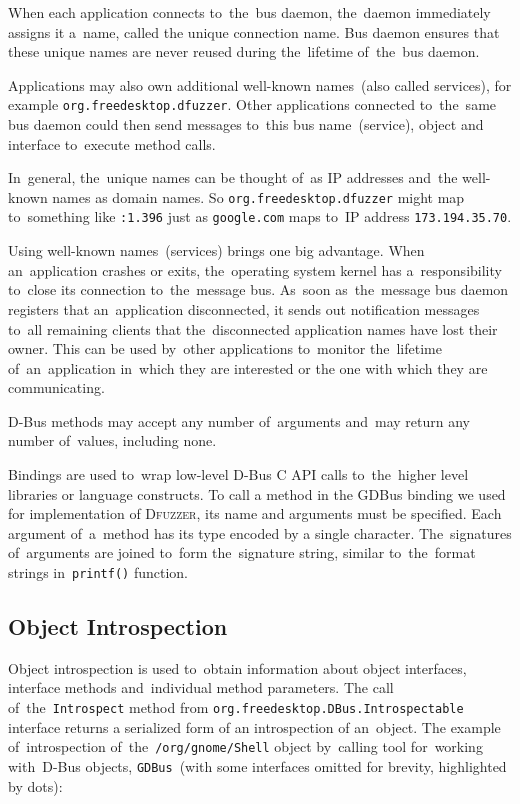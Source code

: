 \documentclass[conference]{IEEEtran}
\begin{document}
When each application connects to~the~bus daemon, the~daemon immediately
assigns it a~name, called the unique connection name. Bus daemon ensures that
these unique names are never reused during the~lifetime of~the~bus daemon.


Applications may also own additional well-known names~(also called services),
for example \texttt{org.freedesktop.dfuzzer}. Other applications connected
to~the~same bus daemon could then send messages to~this bus name~(service),
object and interface to~execute method calls.


In~general, the~unique names can be thought of~as IP addresses and~the well-known
names as domain names. So \texttt{org.freedesktop.dfuzzer} might map to~something
like \texttt{:1.396} just as \texttt{google.com} maps to~IP address
\texttt{173.194.35.70}.


Using well-known names~(services) brings one big advantage. When an~application
crashes or exits, the~operating system kernel has a~responsibility to~close
its connection to~the~message bus. As~soon as~the~message bus daemon registers
that an~application disconnected, it sends out notification messages to~all
remaining clients that the~disconnected application names have lost their owner.
This can be used by~other applications to~monitor the~lifetime of~an~application
in~which they are interested or the one with which they are
communicating.

D-Bus methods may accept any number of~arguments and~may return any number
of~values, including none.

Bindings are used to~wrap low-level D-Bus C API calls to~the~higher level
libraries or language constructs. To call a method in the GDBus binding we used
for implementation of \textsc{Dfuzzer}, its name and arguments must be specified. Each
argument of~a~method has its type encoded by a single character. The~signatures
of~arguments are joined to~form the~signature string, similar to~the~format
strings in~\texttt{printf()} function.

\subsection{Object Introspection}

Object introspection is used to~obtain information about object interfaces,
interface methods and~individual method parameters. The call
of~the~\texttt{Introspect} method from
\texttt{org.freedesktop.DBus.Introspectable} interface returns a serialized
form of an introspection of an~object. The example of~introspection
of~the~\texttt{/org/gnome/Shell} object by~calling tool for~working with~D-Bus
objects, \texttt{GDBus}~(with some interfaces omitted for brevity, highlighted
by dots):
\end{document}
